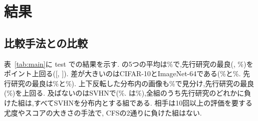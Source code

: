 \section{結果}
\label{sec:results}
\subsection{比較手法との比較}
\label{sec:prior}
表~\ref{tab:main}に test での結果を示す. \Ours{}の5つの平均は\olTestOL\%で,先行研究の最良(\olBestPriorName, \olBestPriorMean\%)を\olGapCfsKnn{}ポイント上回る([\olGapCfsKnnLo, \olGapCfsKnnHi]). 差が大きいのはCIFAR-10とImageNet-64である(\olTestCten\%と\olTestIN\%. 先行研究の最良は\olPriorBestCten\%と\olPriorBestIN\%). 上下反転した分布内の画像も\olTestVf\%で見分け,先行研究の最良(\olVfBestPriorAvg\%)を上回る. 及ばないのはSVHNで(\olTestSVHN\%. \olPriorBestSVHNName{}は\olPriorBestSVHN\%),全\olPairs{}組のうち先行研究のどれかに負けた\olNLostPrior{}組は,すべてSVHNを分布内とする組である. 相手は10回以上の評価を要する尤度やスコアの大きさの手法で, CFSの2通りに負けた組はない.

